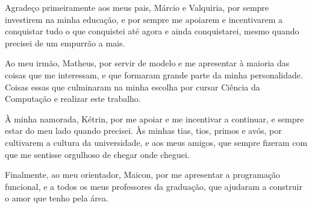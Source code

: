 
\begin{agradecimentos}

    Agradeço primeiramente aos meus pais, Márcio e Valquiria, por sempre investirem na minha educação,
    e por sempre me apoiarem e incentivarem a conquistar tudo o que conquistei até agora e ainda
    conquistarei, mesmo quando precisei de um empurrão a mais.

    Ao meu irmão, Matheus, por servir de modelo e me apresentar à maioria das coisas que me interessam,
    e que formaram grande parte da minha personalidade. Coisas essas que culminaram na minha escolha
    por cursar Ciência da Computação e realizar este trabalho.

    À minha namorada, Kétrin, por me apoiar e me incentivar a continuar, e sempre estar do meu lado
    quando precisei. Às minhas tias, tios, primos e avós, por cultivarem a cultura da universidade,
    e aos meus amigos, que sempre fizeram com que me sentisse orgulhoso de chegar onde cheguei.

    Finalmente, ao meu orientador, Maicon, por me apresentar a programação funcional, e a todos os
    meus professores da graduação, que ajudaram a construir o amor que tenho pela área.

\end{agradecimentos}
